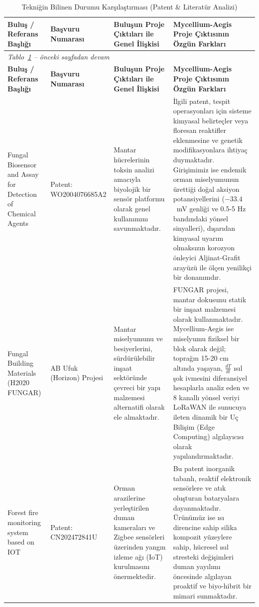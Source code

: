 \documentclass[11pt,a4paper]{article}
\begin{document}
\begin{longtable}{p{3.1cm}p{2.6cm}p{4.3cm}p{4.7cm}}
\caption{Tekniğin Bilinen Durumu Karşılaştırması (Patent \& Literatür Analizi)}\label{tab:tekniginbilinendurumu}\\
\toprule
\textbf{Buluş / Referans Başlığı} & \textbf{Başvuru Numarası} & \textbf{Buluşun Proje Çıktıları ile Genel İlişkisi} & \textbf{Mycellium-Aegis Proje Çıktısının Özgün Farkları}\\
\midrule
\endfirsthead
\multicolumn{4}{l}{\textit{Tablo~\ref{tab:tekniginbilinendurumu} -- önceki sayfadan devam}}\\
\toprule
\textbf{Buluş / Referans Başlığı} & \textbf{Başvuru Numarası} & \textbf{Buluşun Proje Çıktıları ile Genel İlişkisi} & \textbf{Mycellium-Aegis Proje Çıktısının Özgün Farkları}\\
\midrule
\endhead
Fungal Biosensor and Assay for Detection of Chemical Agents & Patent: WO2004076685A2 & Mantar hücrelerinin toksin analizi amacıyla biyolojik bir sensör platformu olarak genel kullanımını savunmaktadır. & İlgili patent, tespit operasyonları için sisteme kimyasal belirteçler veya floresan reaktifler eklenmesine ve genetik modifikasyonlara ihtiyaç duymaktadır. Girişimimiz ise endemik orman miselyumunun ürettiği doğal aksiyon potansiyellerini ($-33.4$~mV genliği ve 0.5-5 Hz bandındaki yönsel sinyalleri), dışarıdan kimyasal uyarım olmaksızın korozyon önleyici Aljinat-Grafit arayüzü ile ölçen yenilikçi bir donanımdır.\\
\addlinespace
Fungal Building Materials (H2020 FUNGAR) & AB Ufuk (Horizon) Projesi & Mantar miselyumunu ve besiyerlerini, sürdürülebilir inşaat sektöründe çevreci bir yapı malzemesi alternatifi olarak ele almaktadır. & FUNGAR projesi, mantar dokusunu statik bir inşaat malzemesi olarak kullanmaktadır. Mycellium-Aegis ise miselyumu fiziksel bir blok olarak değil; toprağın 15-20 cm altında yaşayan, $\frac{dT}{dt}$ ısıl şok ivmesini diferansiyel hesaplarla analiz eden ve 8 kanallı yönsel veriyi LoRaWAN ile sunucuya ileten dinamik bir Uç Bilişim (Edge Computing) algılayıcısı olarak yapılandırmaktadır.\\
\addlinespace
Forest fire monitoring system based on IOT & Patent: CN202472841U & Orman arazilerine yerleştirilen duman kameraları ve Zigbee sensörleri üzerinden yangın izleme ağı (IoT) kurulmasını önermektedir. & Bu patent inorganik tabanlı, reaktif elektronik sensörlere ve atık oluşturan bataryalara dayanmaktadır. Ürünümüz ise ısı direncine sahip silika kompozit yüzeylere sahip, hücresel ısıl stresteki değişimleri duman yayılımı öncesinde algılayan proaktif ve biyo-hibrit bir mimari sunmaktadır.\\
\bottomrule
\end{longtable}
\end{document}
